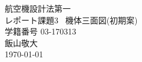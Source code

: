 \documentclass[class=article, crop=false, dvipdfmx, fleqn]{standalone}
\begin{document}
  \begin{titlepage}
  \begin{center}
  \vspace*{150truept}
  {\huge 航空機設計法第一}\\ %
  \vspace{15truept}
  {\huge レポート課題3 \ 機体三面図(初期案)}\\ %
  \vspace{200truept}
  {\large 学籍番号 03-170313}\\ %
  \vspace{10truept}
  {\large 飯山敬大}\\ %
  \vspace{10truept}
  {\large \today}\\ %
  \end{center}
  \end{titlepage}
\end{document}
